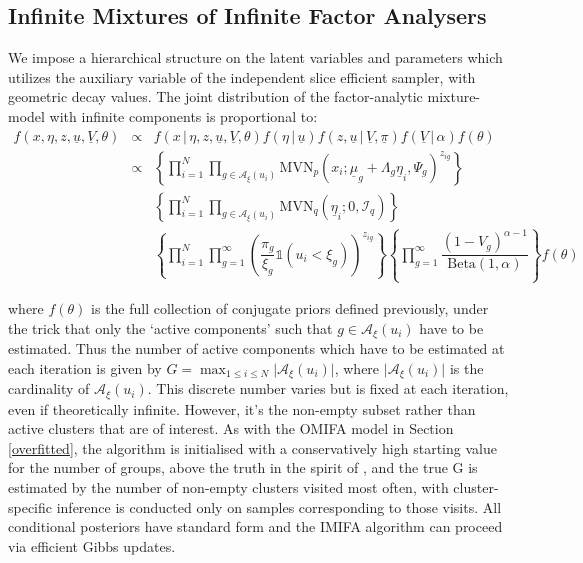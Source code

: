 \documentclass[a4paper,12pt,fleqn]{article}
\numberwithin{equation}{section}
\newcommand{\indicator}[1]{\mathds{1}{\left( {#1} \right) }}
\def\given{\,|\,}
\begin{document}
\subsection[Infinite Mixtures of Infinite Factor Analysers]{Infinite Mixtures of Infinite Factor Analysers}
We impose a hierarchical structure on the latent variables and parameters which utilizes the auxiliary variable of the independent slice efficient sampler, with geometric
decay values. The joint
distribution of the factor-analytic mixture-model with infinite components is proportional to:
\begin{eqnarray}
	f\left(x,\eta,z,\underline{u},\underline{V},\theta\right)&\propto& f\left(x \given \eta,z,\underline{u},\underline{V},\theta\right)f\left(\eta \given \underline{u}\right)f\left(z,\underline{u} \given \underline{V},\underline{\pi}\right)f\left(\underline{V} \given \alpha\right)f\left(\theta\right) \nonumber\\
	&\propto & \left\{\prod_{i=1}^N \prod_{g \in \mathcal{A}_\xi\left(u_i\right)} \textrm{MVN}_p\left(x_i; \underline{\mu}_g + \Lambda_g\underline{\eta}_{i}, \Psi_g\right)^{z_{ig}}\right\} \nonumber\\
	&&\left\{\prod_{i=1}^N \prod_{g \in \mathcal{A}_\xi\left(u_i\right)} \textrm{MVN}_q\left(\underline{\eta}_{i};0,\mathcal{I}_q\right)\right\} \nonumber\\
	&& \left\{ \prod_{i=1}^N \prod_{g=1}^\infty \left(\dfrac{\pi_g}{\xi_g} \indicator{u_i<\xi_g}\right)^{z_{ig}}\right\} \left\{ \prod_{g=1}^\infty \dfrac{(1-V_g)^{\alpha-1}}{\textrm{Beta}\left(1,	\alpha\right)}\right \}f(\theta)\label{eq:43}
\end{eqnarray}

\noindent where $f(\theta)$ is the full collection of conjugate priors defined previously, under the trick that only the `active components' such that $g \in  \mathcal{A}_\xi\left(u_i\right)$ have to be estimated. Thus the number of active components which have to be estimated at each iteration is given by $G=\max_{1 \leq i \leq N} \vert\mathcal{A}_\xi\left(u_i\right)\vert$, where $\vert\mathcal{A}_\xi\left(u_i\right)\vert$ is the cardinality of $\mathcal{A}_\xi\left(u_i\right)$. This discrete number varies but is fixed at each iteration, even if theoretically infinite. However, it's the non-empty subset rather than active clusters that are of interest. As with the OMIFA model in Section \ref{overfitted}, the algorithm is initialised with a conservatively high starting value for the number of groups, above the truth in the spirit of \citet{Hastie2014}, and the true G is estimated by the number of non-empty clusters visited most often, with cluster-specific inference is
conducted only on samples corresponding to those visits. All conditional posteriors have standard form and the IMIFA algorithm can proceed via efficient Gibbs updates. 
\end{document}
